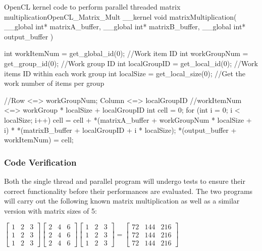 \begin{OpenCL}{OpenCL kernel code to perform parallel threaded matrix multiplication}{OpenCL_Matrix_Mult}
    __kernel void matrixMultiplication(
    __global int* matrixA_buffer,
    __global int* matrixB_buffer,
    __global int* output_buffer
    ){
            int workItemNum = get_global_id(0); //Work item ID
            int workGroupNum = get_group_id(0); //Work group ID
            int localGroupID = get_local_id(0); //Work items ID within each work group
            int localSize = get_local_size(0); //Get the work number of items per group

            //Row <=> workGroupNum; Column <=> localGroupID
            //workItemNum <=> workGroup * localSize + localGroupID
            int cell = 0;
            for (int i = 0; i < localSize; i++) {
                    cell = cell + *(matrixA_buffer + workGroupNum * localSize + i) *
                    *(matrixB_buffer + localGroupID + i * localSize);
                }
            *(output_buffer + workItemNum) = cell;
        }
\end{OpenCL}

\subsubsection{Code Verification}
Both the single thread and parallel program will undergo tests to ensure their correct functionality before their performances are evaluated.
The two programs will carry out the following known matrix multiplication as well as a similar version with matrix sizes of 5:

\vspace{5pt}
$
    \begin{bmatrix}
        1 & 2 & 3 \\
        1 & 2 & 3 \\
        1 & 2 & 3
    \end{bmatrix}
    \begin{bmatrix}
        2 & 4 & 6 \\
        2 & 4 & 6 \\
        2 & 4 & 6
    \end{bmatrix}
    \begin{bmatrix}
        1 & 2 & 3 \\
        1 & 2 & 3 \\
        1 & 2 & 3
    \end{bmatrix}
    =
    \begin{bmatrix}
        72 & 144 & 216 \\
        72 & 144 & 216 \\
        72 & 144 & 216
    \end{bmatrix}
$
\vspace{5pt}

